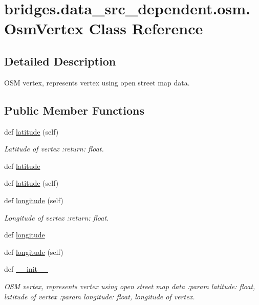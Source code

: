 \hypertarget{classbridges_1_1data__src__dependent_1_1osm_1_1_osm_vertex}{}\section{bridges.\+data\+\_\+src\+\_\+dependent.\+osm.\+Osm\+Vertex Class Reference}
\label{classbridges_1_1data__src__dependent_1_1osm_1_1_osm_vertex}


\subsection{Detailed Description}
O\+SM vertex, represents vertex using open street map data. \subsection*{Public Member Functions}
\begin{DoxyCompactItemize}
\item 
def \hyperlink{classbridges_1_1data__src__dependent_1_1osm_1_1_osm_vertex_a31eefda235d8c4dd065ee5200897b473}{latitude} (self)
\begin{DoxyCompactList}\small\item\em Latitude of vertex \+:return\+: float. \end{DoxyCompactList}\item 
def \hyperlink{classbridges_1_1data__src__dependent_1_1osm_1_1_osm_vertex_add07a32c4c5e0f4af70d790cffa9a6d9}{latitude}
\item 
def \hyperlink{classbridges_1_1data__src__dependent_1_1osm_1_1_osm_vertex_a31eefda235d8c4dd065ee5200897b473}{latitude} (self)
\item 
def \hyperlink{classbridges_1_1data__src__dependent_1_1osm_1_1_osm_vertex_aca0aff0932e5436a0f72e53a93fe8f42}{longitude} (self)
\begin{DoxyCompactList}\small\item\em Longitude of vertex \+:return\+: float. \end{DoxyCompactList}\item 
def \hyperlink{classbridges_1_1data__src__dependent_1_1osm_1_1_osm_vertex_acf84d4c73cbffae355ec49c03b3f48c7}{longitude}
\item 
def \hyperlink{classbridges_1_1data__src__dependent_1_1osm_1_1_osm_vertex_aca0aff0932e5436a0f72e53a93fe8f42}{longitude} (self)
\item 
def \hyperlink{classbridges_1_1data__src__dependent_1_1osm_1_1_osm_vertex_a64fa8f3bfc7df74b5fa93bcc7326e6ac}{\+\_\+\+\_\+init\+\_\+\+\_\+}
\begin{DoxyCompactList}\small\item\em O\+SM vertex, represents vertex using open street map data \+:param latitude\+: float, latitude of vertex \+:param longitude\+: float, longitude of vertex. \end{DoxyCompactList}\end{DoxyCompactItemize}
